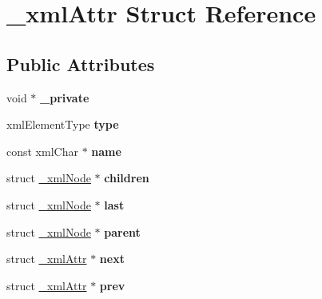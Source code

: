 \hypertarget{struct__xml_attr}{}\section{\+\_\+xml\+Attr Struct Reference}
\label{struct__xml_attr}
\subsection*{Public Attributes}
\begin{DoxyCompactItemize}
\item 
\mbox{\label{struct__xml_attr_a80c0c3cbec280867b44184c8324ad7a0}} 
void $\ast$ {\bfseries \+\_\+private}
\item 
\mbox{\label{struct__xml_attr_a6ea09ec52d7c7a53d672ecc0883daf68}} 
xml\+Element\+Type {\bfseries type}
\item 
\mbox{\label{struct__xml_attr_ac3cd8a335c95c1177694a0a7f54cc4bd}} 
const xml\+Char $\ast$ {\bfseries name}
\item 
\mbox{\label{struct__xml_attr_a0ce573bf6900760b1197d18b87a58355}} 
struct \mbox{\hyperlink{struct__xml_node}{\+\_\+xml\+Node}} $\ast$ {\bfseries children}
\item 
\mbox{\label{struct__xml_attr_a323adbb35f22840ea387a458d534eefa}} 
struct \mbox{\hyperlink{struct__xml_node}{\+\_\+xml\+Node}} $\ast$ {\bfseries last}
\item 
\mbox{\label{struct__xml_attr_aa429db5b123faf9f5dfde989a7fc912d}} 
struct \mbox{\hyperlink{struct__xml_node}{\+\_\+xml\+Node}} $\ast$ {\bfseries parent}
\item 
\mbox{\label{struct__xml_attr_a4a72c119c75d1b8b6247ad9c7b6e46a7}} 
struct \mbox{\hyperlink{struct__xml_attr}{\+\_\+xml\+Attr}} $\ast$ {\bfseries next}
\item 
\mbox{\label{struct__xml_attr_aaed75b2ddf6ebbe013043a60368344f3}} 
struct \mbox{\hyperlink{struct__xml_attr}{\+\_\+xml\+Attr}} $\ast$ {\bfseries prev}
\item 
\mbox{\label{struct__xml_attr_ab2eb84cdffefadddcc48fc33b7ca2d75}} 

\end{DoxyCompactItemize}
